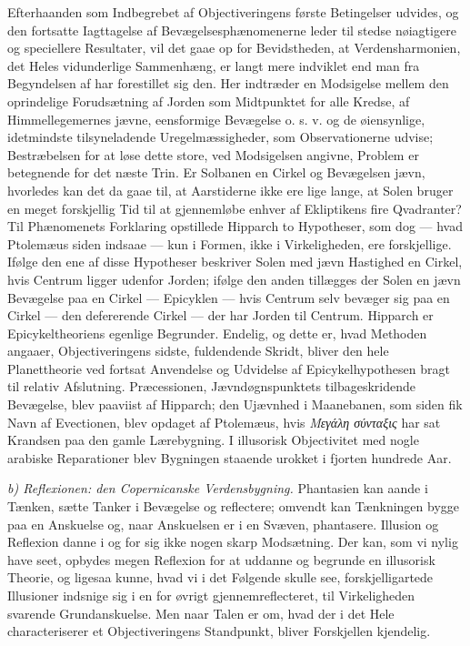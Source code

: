 \documentclass[12pt,a4paper]{book}
\newcommand{\runin}[1]{\emph{#1}\hspace{0.4em}}
\begin{document}
Efterhaanden som Indbegrebet af Objectiveringens første Betingelser
udvides, og den fortsatte Iagttagelse af Bevægelsesphænomenerne leder
til stedse nøiagtigere og speciellere Resultater, vil det gaae op for
Bevidstheden, at Verdensharmonien, det Heles vidunderlige Sammenhæng,
er langt mere indviklet end man fra Begyndelsen af har forestillet sig
den. Her indtræder en Modsigelse mellem den oprindelige Forudsætning af
Jorden som Midtpunktet for alle Kredse, af Himmellegemernes jævne,
eensformige Bevægelse o. s. v. og de øiensynlige, idetmindste
tilsyneladende Uregelmæssigheder, som Observationerne udvise;
Bestræbelsen for at løse dette store, ved Modsigelsen angivne, Problem
er betegnende for det næste Trin. Er Solbanen en Cirkel og Bevægelsen
jævn, hvorledes kan det da gaae til, at Aarstiderne ikke ere lige
lange, at Solen bruger en meget forskjellig Tid til at gjennemløbe
enhver af Ekliptikens fire Qvadranter? Til Phænomenets Forklaring
opstillede Hipparch to Hypotheser, som dog --- hvad Ptolemæus siden
indsaae --- kun i Formen, ikke i Virkeligheden, ere forskjellige.
Ifølge den ene af disse Hypotheser beskriver Solen med jævn Hastighed
en Cirkel, hvis Centrum ligger udenfor Jorden;
ifølge den anden tillægges der Solen en jævn Bevægelse paa en Cirkel
--- Epicyklen --- hvis Centrum selv bevæger sig paa en Cirkel --- den
defererende Cirkel --- der har Jorden til Centrum.
Hipparch er Epicykeltheoriens egenlige Begrunder. Endelig, og dette er,
hvad Methoden angaaer, Objectiveringens sidste, fuldendende Skridt,
bliver den hele Planettheorie ved fortsat Anvendelse og Udvidelse af
Epicykelhypothesen bragt til relativ Afslutning. Præcessionen,
Jævndøgnspunktets tilbageskridende Bevægelse, blev paaviist af
Hipparch; den Ujævnhed i Maanebanen, som siden fik Navn af Evectionen,
blev opdaget af Ptolemæus, hvis \textit{Μεγάλη σύνταξις} har sat
Krandsen paa den gamle Lærebygning. I illusorisk Objectivitet med nogle
arabiske Reparationer blev Bygningen staaende urokket i fjorten
hundrede Aar.

\runin{b) Reflexionen: den Copernicanske Verdensbygning.} Phantasien
kan aande i Tænken, sætte Tanker i Bevægelse og reflectere; omvendt kan
Tænkningen bygge paa en Anskuelse og, naar Anskuelsen er i en Svæven,
phantasere. Illusion og Reflexion danne i og for sig ikke nogen skarp
Modsætning. Der kan, som vi nylig have seet, opbydes megen Reflexion
for at uddanne og begrunde en illusorisk Theorie, og ligesaa kunne,
hvad vi i det Følgende skulle see, forskjelligartede Illusioner
indsnige sig i en for øvrigt gjennemreflecteret, til Virkeligheden
svarende Grundanskuelse. Men naar Talen er om, hvad der i det Hele
characteriserer et Objectiveringens Standpunkt, bliver Forskjellen
kjendelig.
\end{document}
